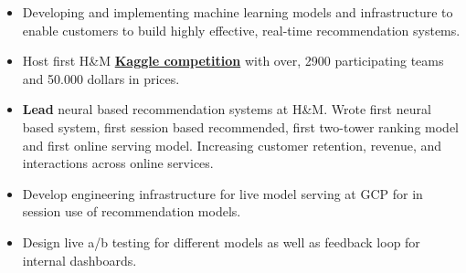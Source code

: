 \documentclass[10pt,a4paper,ragged2e]{texfiles/altacv}
\begin{document}

\begin{fullwidth}
\makecvheader
\end{fullwidth}




\begin{itemize}
    \item Developing and implementing machine learning models and infrastructure to enable customers to build highly effective, real-time recommendation systems.
\end{itemize}
\vspace{4px}
\begin{itemize}
    \item Host first H\&M \href{https://www.kaggle.com/competitions/h-and-m-personalized-fashion-recommendations}{\textbf{Kaggle competition}} with over, 2900 participating teams and 50.000 dollars in prices.
    \item \textbf{Lead} neural based recommendation systems at H\&M. Wrote first neural based system, first session based recommended, first two-tower ranking model and first online serving model. Increasing customer retention, revenue, and interactions across online services.
    \item Develop engineering infrastructure for live model serving at GCP for in session use of recommendation models.
    \item Design live a/b testing for different models as well as feedback loop for internal dashboards.
\end{itemize}
\end{document}

